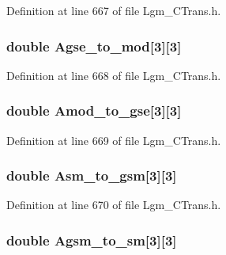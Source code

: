 Definition at line 667 of file Lgm\_\-CTrans.h.\hypertarget{struct_lgm___c_trans_88dce682aa4e24179457f6616bb847c8}{
\subsubsection[{Agse\_\-to\_\-mod}]{\setlength{\rightskip}{0pt plus 5cm}double {\bf Agse\_\-to\_\-mod}\mbox{[}3\mbox{]}\mbox{[}3\mbox{]}}}
\label{struct_lgm___c_trans_88dce682aa4e24179457f6616bb847c8}




Definition at line 668 of file Lgm\_\-CTrans.h.\hypertarget{struct_lgm___c_trans_346796db2e332c3bb5a1a565ade74e2e}{
\subsubsection[{Amod\_\-to\_\-gse}]{\setlength{\rightskip}{0pt plus 5cm}double {\bf Amod\_\-to\_\-gse}\mbox{[}3\mbox{]}\mbox{[}3\mbox{]}}}
\label{struct_lgm___c_trans_346796db2e332c3bb5a1a565ade74e2e}




Definition at line 669 of file Lgm\_\-CTrans.h.\hypertarget{struct_lgm___c_trans_d060a87c222bb9f364f1196fc89ac03c}{
\subsubsection[{Asm\_\-to\_\-gsm}]{\setlength{\rightskip}{0pt plus 5cm}double {\bf Asm\_\-to\_\-gsm}\mbox{[}3\mbox{]}\mbox{[}3\mbox{]}}}
\label{struct_lgm___c_trans_d060a87c222bb9f364f1196fc89ac03c}




Definition at line 670 of file Lgm\_\-CTrans.h.\hypertarget{struct_lgm___c_trans_63d0ecd0a47f3ec17a7858304cd1cf99}{
\subsubsection[{Agsm\_\-to\_\-sm}]{\setlength{\rightskip}{0pt plus 5cm}double {\bf Agsm\_\-to\_\-sm}\mbox{[}3\mbox{]}\mbox{[}3\mbox{]}}}
\label{struct_lgm___c_trans_63d0ecd0a47f3ec17a7858304cd1cf99}




